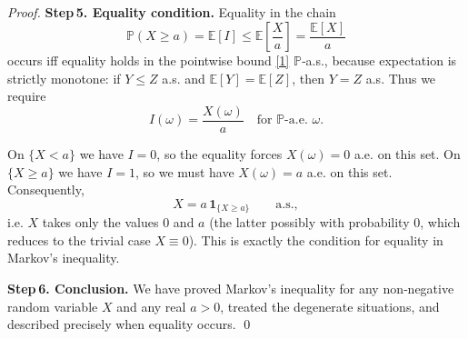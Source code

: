 \begin{proof}
\textbf{Step 5. Equality condition.}  
Equality in the chain
\[
\mathbb{P}(X\ge a)=\mathbb{E}[I]\le\mathbb{E}\!\left[\frac{X}{a}\right]=\frac{\mathbb{E}[X]}{a}
\]
occurs iff equality holds in the pointwise bound \eqref{1} $\mathbb{P}$‑a.s., because expectation is strictly monotone: if $Y\le Z$ a.s. and $\mathbb{E}[Y]=\mathbb{E}[Z]$, then $Y=Z$ a.s.  
Thus we require
\[
I(\omega)=\frac{X(\omega)}{a}\quad\text{for }\mathbb{P}\text{-a.e. }\omega.
\]

On $\{X<a\}$ we have $I=0$, so the equality forces $X(\omega)=0$ a.e. on this set.  
On $\{X\ge a\}$ we have $I=1$, so we must have $X(\omega)=a$ a.e. on this set.  
Consequently,
\[
X = a\,\mathbf 1_{\{X\ge a\}}\qquad\text{a.s.},
\]
i.e. $X$ takes only the values $0$ and $a$ (the latter possibly with probability $0$, which reduces to the trivial case $X\equiv0$).  This is exactly the condition for equality in Markov’s inequality.

\textbf{Step 6. Conclusion.}  
We have proved Markov’s inequality for any non‑negative random variable $X$ and any real $a>0$, treated the degenerate situations, and described precisely when equality occurs. \qed
\end{proof}